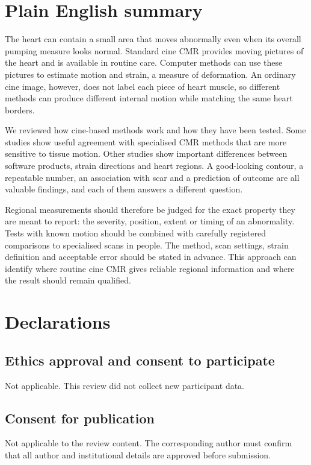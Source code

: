 \documentclass[11pt,a4paper]{article}
\begin{document}
\section*{Plain English summary}
The heart can contain a small area that moves abnormally even when its overall pumping measure looks normal. Standard cine CMR provides moving pictures of the heart and is available in routine care. Computer methods can use these pictures to estimate motion and strain, a measure of deformation. An ordinary cine image, however, does not label each piece of heart muscle, so different methods can produce different internal motion while matching the same heart borders.

We reviewed how cine-based methods work and how they have been tested. Some studies show useful agreement with specialised CMR methods that are more sensitive to tissue motion. Other studies show important differences between software products, strain directions and heart regions. A good-looking contour, a repeatable number, an association with scar and a prediction of outcome are all valuable findings, and each of them answers a different question.

Regional measurements should therefore be judged for the exact property they are meant to report: the severity, position, extent or timing of an abnormality. Tests with known motion should be combined with carefully registered comparisons to specialised scans in people. The method, scan settings, strain definition and acceptable error should be stated in advance. This approach can identify where routine cine CMR gives reliable regional information and where the result should remain qualified.



\section*{Declarations}

\subsection*{Ethics approval and consent to participate}
Not applicable. This review did not collect new participant data.

\subsection*{Consent for publication}
Not applicable to the review content. The corresponding author must confirm that all author and institutional details are approved before submission.
\end{document}
